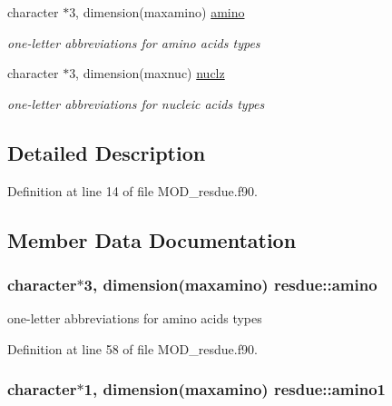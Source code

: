 \begin{DoxyCompactItemize}
character $\ast$3, dimension(maxamino) \hyperlink{classresdue_acea85674eb542d6e47f7d003f5a61db0}{amino}
\begin{DoxyCompactList}\small\item\em one-\/letter abbreviations for amino acids types \end{DoxyCompactList}\item 
character $\ast$3, dimension(maxnuc) \hyperlink{classresdue_acb729218ac3b4c499e444a8aa0019071}{nuclz}
\begin{DoxyCompactList}\small\item\em one-\/letter abbreviations for nucleic acids types \end{DoxyCompactList}\end{DoxyCompactItemize}


\subsection{Detailed Description}


Definition at line 14 of file M\-O\-D\-\_\-resdue.\-f90.



\subsection{Member Data Documentation}
\hypertarget{classresdue_acea85674eb542d6e47f7d003f5a61db0}{
\subsubsection[{amino}]{\setlength{\rightskip}{0pt plus 5cm}character$\ast$3, dimension(maxamino) resdue\-::amino}}\label{classresdue_acea85674eb542d6e47f7d003f5a61db0}


one-\/letter abbreviations for amino acids types 



Definition at line 58 of file M\-O\-D\-\_\-resdue.\-f90.

\hypertarget{classresdue_ad1edc9b99c91a6e19f753eb94b674bb2}{
\subsubsection[{amino1}]{\setlength{\rightskip}{0pt plus 5cm}character$\ast$1, dimension(maxamino) resdue\-::amino1}}\label{classresdue_ad1edc9b99c91a6e19f753eb94b674bb2}



